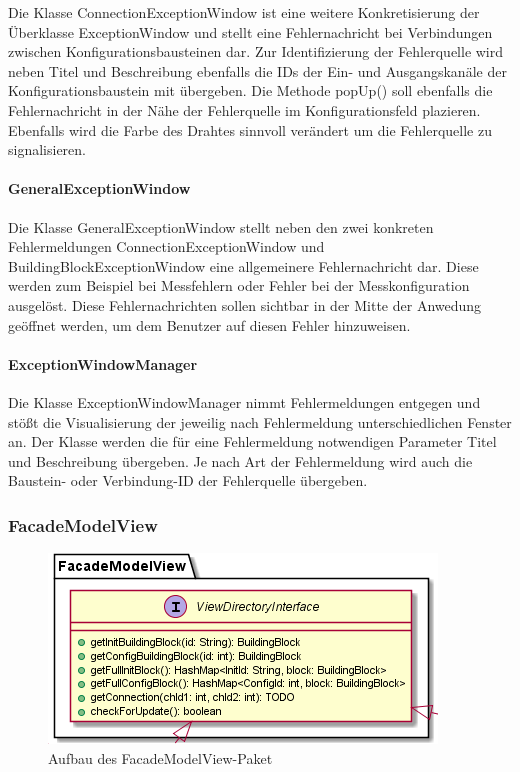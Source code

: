 \documentclass[parskip=full]{scrartcl}
\begin{document}
Die Klasse ConnectionExceptionWindow ist eine weitere Konkretisierung der Überklasse ExceptionWindow und stellt eine Fehlernachricht bei Verbindungen zwischen Konfigurationsbausteinen dar. Zur Identifizierung der Fehlerquelle wird neben Titel und Beschreibung ebenfalls die IDs der Ein- und Ausgangskanäle der Konfigurationsbaustein mit übergeben. Die Methode popUp() soll ebenfalls die Fehlernachricht in der Nähe der Fehlerquelle im Konfigurationsfeld plazieren. Ebenfalls wird die Farbe des Drahtes sinnvoll verändert um die Fehlerquelle zu signalisieren.

\paragraph{GeneralExceptionWindow}

Die Klasse GeneralExceptionWindow stellt neben den zwei konkreten Fehlermeldungen ConnectionExceptionWindow und BuildingBlockExceptionWindow eine allgemeinere Fehlernachricht dar. Diese werden zum Beispiel bei Messfehlern oder Fehler bei der Messkonfiguration ausgelöst. Diese Fehlernachrichten sollen sichtbar in der Mitte der Anwedung geöffnet werden, um dem Benutzer auf diesen Fehler hinzuweisen. 

\paragraph{ExceptionWindowManager}

Die Klasse ExceptionWindowManager nimmt Fehlermeldungen entgegen und stößt die Visualisierung der jeweilig nach Fehlermeldung unterschiedlichen Fenster an. Der Klasse werden die für eine Fehlermeldung notwendigen Parameter Titel und  Beschreibung übergeben. Je nach Art der Fehlermeldung wird auch die Baustein- oder Verbindung-ID der Fehlerquelle übergeben.

\subsubsection {FacadeModelView}

\begin{figure}[htbp]
	\begin{center}
		\includegraphics[width = 12 cm]{Grafiken/View/FacadeModelViewNamespace.png}
		\caption{Aufbau des FacadeModelView-Paket}
		\label{Entwurf_Grob}
	\end{center}
\end{figure}
\end{document}
